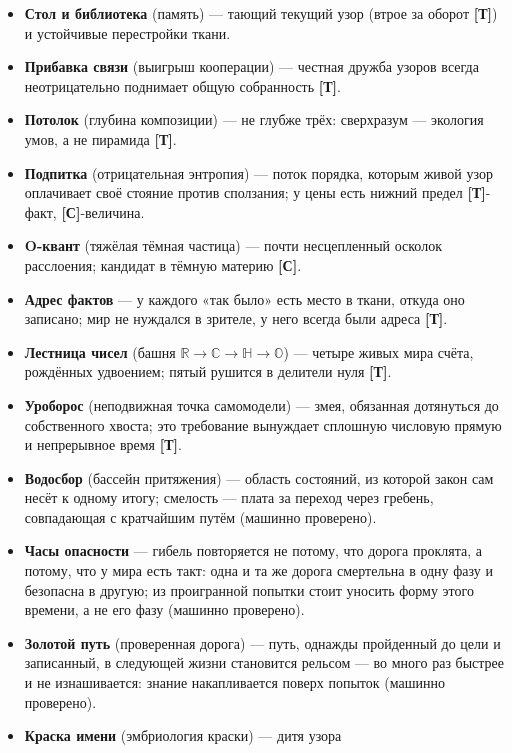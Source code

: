 \documentclass[11pt,letterpaper]{article}
\newcommand{\stT}{\textbf{[Т]}\xspace}
\newcommand{\stC}{\textbf{[С]}\xspace}
\begin{document}
\begin{itemize}[leftmargin=1.4em, itemsep=1pt, parsep=0pt]
    $2{,}8$ бита за шаг, полная мысль --- от восемнадцати шагов \stT.
  \item \textbf{Стол и библиотека} (память) --- тающий текущий узор
    (втрое за оборот \stT) и устойчивые перестройки ткани.
  \item \textbf{Прибавка связи} (выигрыш кооперации) --- честная
    дружба узоров всегда неотрицательно поднимает общую
    собранность \stT.
  \item \textbf{Потолок} (глубина композиции) --- не глубже трёх:
    сверхразум --- экология умов, а не пирамида \stT.
  \item \textbf{Подпитка} (отрицательная энтропия) --- поток
    порядка, которым живой узор оплачивает своё стояние против
    сползания; у цены есть нижний предел \stT-факт, \stC-величина.
  \item \textbf{O-квант} (тяжёлая тёмная частица) --- почти
    несцепленный осколок расслоения; кандидат в тёмную материю \stC.
  \item \textbf{Адрес фактов} --- у каждого «так было» есть место в
    ткани, откуда оно записано; мир не нуждался в зрителе, у него
    всегда были адреса \stT.
  \item \textbf{Лестница чисел} (башня $\mathbb{R}{\to}\mathbb{C}{\to}
    \mathbb{H}{\to}\mathbb{O}$) --- четыре живых мира счёта,
    рождённых удвоением; пятый рушится в делители нуля \stT.
  \item \textbf{Уроборос} (неподвижная точка самомодели) --- змея,
    обязанная дотянуться до собственного хвоста; это требование
    вынуждает сплошную числовую прямую и непрерывное время \stT.
  \item \textbf{Водосбор} (бассейн притяжения) --- область состояний,
    из которой закон сам несёт к одному итогу; смелость --- плата за
    переход через гребень, совпадающая с кратчайшим путём (машинно
    проверено).
  \item \textbf{Часы опасности} --- гибель повторяется не потому,
    что дорога проклята, а потому, что у мира есть такт: одна и та
    же дорога смертельна в одну фазу и безопасна в другую; из
    проигранной попытки стоит уносить форму этого времени, а не его
    фазу (машинно проверено).
  \item \textbf{Золотой путь} (проверенная дорога) --- путь,
    однажды пройденный до цели и записанный, в следующей жизни
    становится рельсом --- во много раз быстрее и не изнашивается:
    знание накапливается поверх попыток (машинно проверено).
  \item \textbf{Краска имени} (эмбриология краски) --- дитя узора

\end{itemize}
\end{document}

